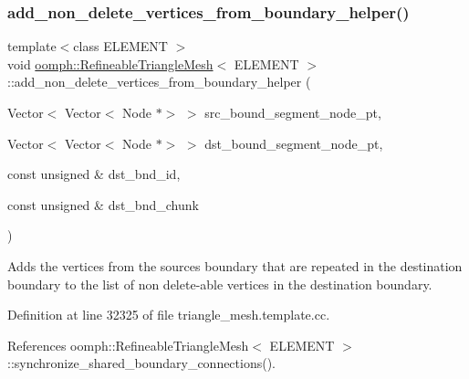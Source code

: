 \mbox{\label{classoomph_1_1RefineableTriangleMesh_a2d290418f7617412aebc3d66bcace8b1}} 
\subsubsection{\texorpdfstring{add\+\_\+non\+\_\+delete\+\_\+vertices\+\_\+from\+\_\+boundary\+\_\+helper()}{add\_non\_delete\_vertices\_from\_boundary\_helper()}}
{\footnotesize\ttfamily template$<$class E\+L\+E\+M\+E\+NT $>$ \\
void \hyperlink{classoomph_1_1RefineableTriangleMesh}{oomph\+::\+Refineable\+Triangle\+Mesh}$<$ E\+L\+E\+M\+E\+NT $>$\+::add\+\_\+non\+\_\+delete\+\_\+vertices\+\_\+from\+\_\+boundary\+\_\+helper (\begin{DoxyParamCaption}\item[{Vector$<$ Vector$<$ Node $\ast$$>$ $>$}]{src\+\_\+bound\+\_\+segment\+\_\+node\+\_\+pt,  }\item[{Vector$<$ Vector$<$ Node $\ast$$>$ $>$}]{dst\+\_\+bound\+\_\+segment\+\_\+node\+\_\+pt,  }\item[{const unsigned \&}]{dst\+\_\+bnd\+\_\+id,  }\item[{const unsigned \&}]{dst\+\_\+bnd\+\_\+chunk }\end{DoxyParamCaption})\hspace{0.3cm}{\ttfamily [protected]}}



Adds the vertices from the sources boundary that are repeated in the destination boundary to the list of non delete-\/able vertices in the destination boundary. 



Definition at line 32325 of file triangle\+\_\+mesh.\+template.\+cc.



References oomph\+::\+Refineable\+Triangle\+Mesh$<$ E\+L\+E\+M\+E\+N\+T $>$\+::synchronize\+\_\+shared\+\_\+boundary\+\_\+connections().



